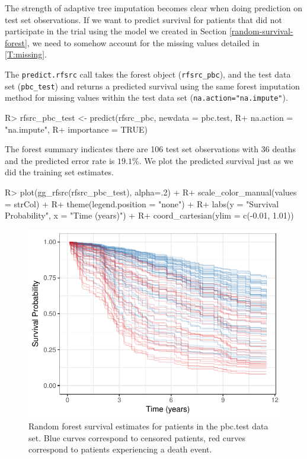 \documentclass[article, nojss]{jss}
\begin{document}
The strength of adaptive tree imputation becomes clear when doing
prediction on test set observations. If we want to predict survival for
patients that did not participate in the trial using the model we
created in Section \ref{random-survival-forest}, we need to somehow
account for the missing values detailed in \autoref{T:missing}.

The \texttt{predict.rfsrc} call takes the forest object
(\texttt{rfsrc\_pbc}), and the test data set (\texttt{pbc\_test}) and
returns a predicted survival using the same forest imputation method for
missing values within the test data set
(\texttt{na.action="na.impute"}).

\begin{Schunk}
\begin{Sinput}
R> rfsrc_pbc_test <- predict(rfsrc_pbc, newdata = pbc.test,
R+                           na.action = "na.impute",
R+                           importance = TRUE)
\end{Sinput}
\end{Schunk}

The forest summary indicates there are 106 test set observations with 36
deaths and the predicted error rate is \(19.1\%\). We plot the predicted
survival just as we did the training set estimates.

\begin{Schunk}
\begin{Sinput}
R> plot(gg_rfsrc(rfsrc_pbc_test), alpha=.2) +
R+   scale_color_manual(values = strCol) +
R+   theme(legend.position = "none") +
R+   labs(y = "Survival Probability", x = "Time (years)") +
R+   coord_cartesian(ylim = c(-0.01, 1.01))
\end{Sinput}
\begin{figure}[!htb]

{\centering \includegraphics{rfs-predictPlot-1}

}

\caption[Random forest survival estimates for patients in the pbc.test data set]{Random forest survival estimates for patients in the pbc.test data set. Blue curves correspond to censored patients, red curves correspond to patients experiencing a death event.}\label{fig:predictPlot}
\end{figure}
\end{Schunk}
\end{document}
